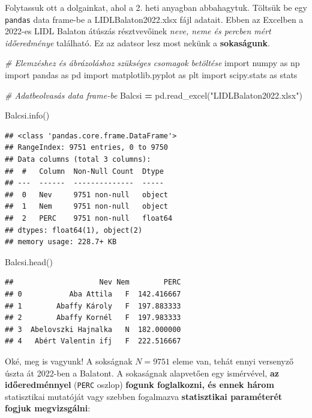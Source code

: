 \documentclass[
]{book}
\newenvironment{Shaded}{\begin{snugshade}}{\end{snugshade}}
\newcommand{\CommentTok}[1]{\textcolor[rgb]{0.56,0.35,0.01}{\textit{#1}}}
\newcommand{\ImportTok}[1]{#1}
\newcommand{\NormalTok}[1]{#1}
\newcommand{\OperatorTok}[1]{\textcolor[rgb]{0.81,0.36,0.00}{\textbf{#1}}}
\newcommand{\StringTok}[1]{\textcolor[rgb]{0.31,0.60,0.02}{#1}}
\begin{document}
Folytassuk ott a dolgainkat, ahol a 2. heti anyagban abbahagytuk. Töltsük be egy \texttt{pandas} data frame-be a LIDLBalaton2022.xlsx fájl adatait. Ebben az Excelben a 2022-es LIDL Balaton átúszás résztvevőinek \emph{neve, neme és percben mért időeredménye} található. Ez az adatsor lesz most nekünk a \textbf{sokaságunk}.

\begin{Shaded}
\begin{Highlighting}[]
\CommentTok{\# Elemzéshez és ábrázoláshoz szükséges csomagok betöltése}
\ImportTok{import}\NormalTok{ numpy }\ImportTok{as}\NormalTok{ np}
\ImportTok{import}\NormalTok{ pandas }\ImportTok{as}\NormalTok{ pd}
\ImportTok{import}\NormalTok{ matplotlib.pyplot }\ImportTok{as}\NormalTok{ plt}
\ImportTok{import}\NormalTok{ scipy.stats }\ImportTok{as}\NormalTok{ stats}

\CommentTok{\# Adatbeolvasás data frame{-}be}
\NormalTok{Balcsi }\OperatorTok{=}\NormalTok{ pd.read\_excel(}\StringTok{"LIDLBalaton2022.xlsx"}\NormalTok{)}

\NormalTok{Balcsi.info()}
\end{Highlighting}
\end{Shaded}

\begin{verbatim}
## <class 'pandas.core.frame.DataFrame'>
## RangeIndex: 9751 entries, 0 to 9750
## Data columns (total 3 columns):
##  #   Column  Non-Null Count  Dtype  
## ---  ------  --------------  -----  
##  0   Nev     9751 non-null   object 
##  1   Nem     9751 non-null   object 
##  2   PERC    9751 non-null   float64
## dtypes: float64(1), object(2)
## memory usage: 228.7+ KB
\end{verbatim}

\begin{Shaded}
\begin{Highlighting}[]
\NormalTok{Balcsi.head()}
\end{Highlighting}
\end{Shaded}

\begin{verbatim}
##                    Nev Nem        PERC
## 0           Aba Attila   F  142.416667
## 1        Abaffy Károly   F  197.883333
## 2        Abaffy Kornél   F  197.983333
## 3  Abelovszki Hajnalka   N  182.000000
## 4   Abért Valentin ifj   F  222.516667
\end{verbatim}

Oké, meg is vagyunk! A sokságnak \(N=9751\) eleme van, tehát ennyi versenyző úszta át 2022-ben a Balatont. A sokaságnak alapvetően egy ismérvével, \textbf{az időeredménnyel} (\texttt{PERC} oszlop) \textbf{fogunk foglalkozni, és ennek három} statisztikai mutatóját vagy szebben fogalmazva \textbf{statisztikai paraméterét fogjuk megvizsgálni}:
\end{document}
